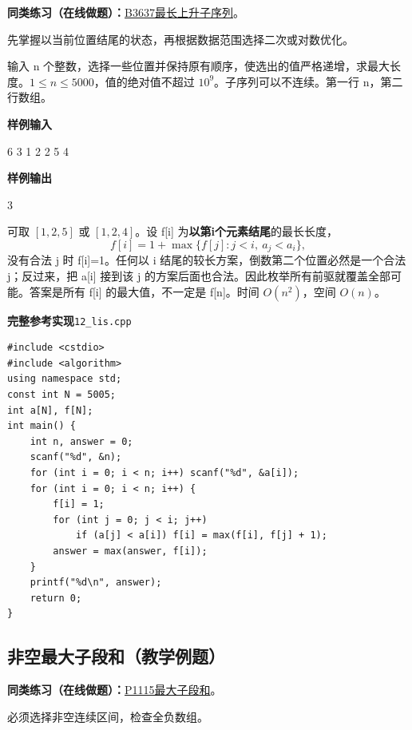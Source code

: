 \documentclass[UTF8,11pt,a4paper,fontset=none]{ctexart}
\newcommand{\practice}[2]{\par\noindent\textbf{同类练习（在线做题）：}\href{https://www.luogu.com.cn/problem/#1}{#1\quad #2}。\par}
\begin{document}
\practice{B3637}{最长上升子序列}
先掌握以当前位置结尾的状态，再根据数据范围选择二次或对数优化。

输入 n 个整数，选择一些位置并保持原有顺序，使选出的值严格递增，求最大长度。$1\le n\le5000$，值的绝对值不超过 $10^9$。子序列可以不连续。第一行 n，第二行数组。
\begin{tcolorbox}[samplebox,title={输入输出样例}]
\textbf{样例输入}
\begin{Sample}
6
3 1 2 2 5 4
\end{Sample}
\tcblower
\textbf{样例输出}
\begin{Sample}
3
\end{Sample}
\end{tcolorbox}
可取 $[1,2,5]$ 或 $[1,2,4]$。设 f[i] 为\textbf{以第i个元素结尾}的最长长度，
\[f[i]=1+\max\{f[j]:j<i,\ a_j<a_i\},\]
没有合法 j 时 f[i]=1。任何以 i 结尾的较长方案，倒数第二个位置必然是一个合法 j；反过来，把 a[i] 接到该 j 的方案后面也合法。因此枚举所有前驱就覆盖全部可能。答案是所有 f[i] 的最大值，不一定是 f[n]。时间 $O(n^2)$，空间 $O(n)$。
\par\noindent\begin{minipage}{\linewidth}
\textbf{完整参考实现}\quad\texttt{12\_lis.cpp}
\begin{lstlisting}
#include <cstdio>
#include <algorithm>
using namespace std;
const int N = 5005;
int a[N], f[N];
int main() {
    int n, answer = 0;
    scanf("%d", &n);
    for (int i = 0; i < n; i++) scanf("%d", &a[i]);
    for (int i = 0; i < n; i++) {
        f[i] = 1;
        for (int j = 0; j < i; j++)
            if (a[j] < a[i]) f[i] = max(f[i], f[j] + 1);
        answer = max(answer, f[i]);
    }
    printf("%d\n", answer);
    return 0;
}
\end{lstlisting}
\end{minipage}\par

\subsection{非空最大子段和（教学例题）}

\practice{P1115}{最大子段和}
必须选择非空连续区间，检查全负数组。
\end{document}
